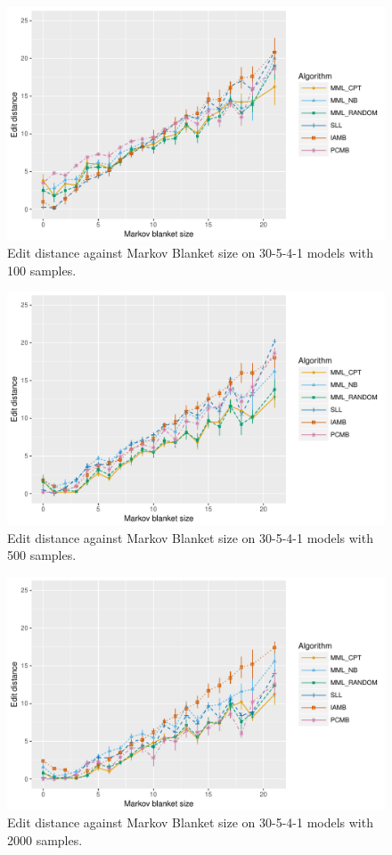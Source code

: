 \documentclass{svmult}
\begin{document}
\begin{figure}[hbt]
  \centering
    \includegraphics[scale=0.6]{figures/ed_vs_mbsize_30_5_4_1_100.pdf}
  \caption{Edit distance against Markov Blanket size on 30-5-4-1 models with 100 samples.}
\end{figure} 

\begin{figure}[hbt]
  \centering
    \includegraphics[scale=0.6]{figures/ed_vs_mbsize_30_5_4_1_500.pdf}
  \caption{Edit distance against Markov Blanket size on 30-5-4-1 models with 500 samples.}
\end{figure}

\begin{figure}[hbt]
  \centering
    \includegraphics[scale=0.6]{figures/ed_vs_mbsize_30_5_4_1_2000.pdf}
  \caption{Edit distance against Markov Blanket size on 30-5-4-1 models with 2000 samples.}
\end{figure} 
\end{document}
